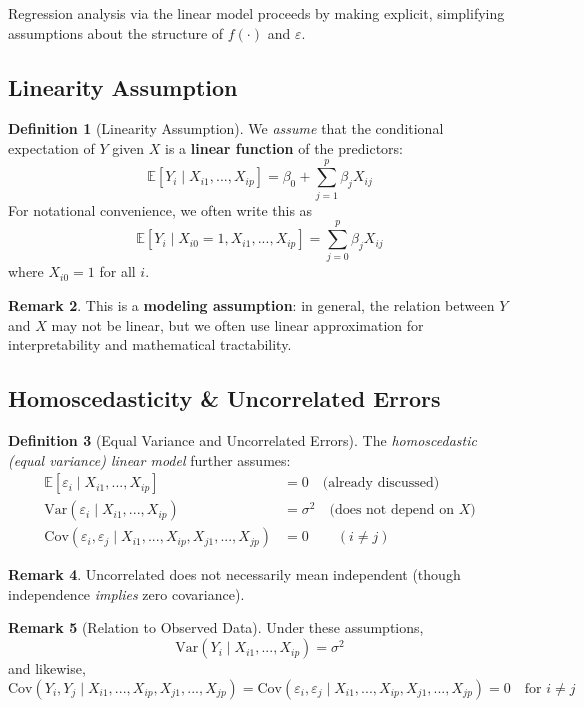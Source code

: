 \documentclass[11pt]{article}
\theoremstyle{definition}
\newtheorem{definition}{Definition}[section]
\theoremstyle{plain}
\theoremstyle{definition}
\newtheorem{remark}[definition]{Remark}
\begin{document}
Regression analysis via the linear model proceeds by making explicit, simplifying assumptions about the structure of $f(\cdot)$ and $\varepsilon$.

\subsection{Linearity Assumption}

\begin{definition}[Linearity Assumption]
We \emph{assume} that the conditional expectation of $Y$ given $X$ is a \textbf{linear function} of the predictors:
\[
\mathbb{E}[Y_i \mid X_{i1}, ..., X_{ip}] = \beta_0 + \sum_{j=1}^{p} \beta_j X_{ij}
\]
For notational convenience, we often write this as
\[
\mathbb{E}[Y_i \mid X_{i0}=1, X_{i1}, ..., X_{ip}] = \sum_{j=0}^p \beta_j X_{ij}
\]
where $X_{i0}=1$ for all $i$.
\end{definition}

\begin{remark}
This is a \textbf{modeling assumption}: in general, the relation between $Y$ and $X$ may not be linear, but we often use linear approximation for interpretability and mathematical tractability.
\end{remark}

\subsection{Homoscedasticity \& Uncorrelated Errors}

\begin{definition}[Equal Variance and Uncorrelated Errors]
The \emph{homoscedastic (equal variance) linear model} further assumes:
\begin{align*}
\mathbb{E}[\varepsilon_i \mid X_{i1},...,X_{ip}] &= 0 \quad\text{(already discussed)}\\
\mathrm{Var}(\varepsilon_i \mid X_{i1},...,X_{ip}) &= \sigma^2 \quad\text{(does not depend on $X$)}\\
\mathrm{Cov}(\varepsilon_i, \varepsilon_j \mid X_{i1},...,X_{ip}, X_{j1},...,X_{jp}) &= 0 \qquad (i \neq j)
\end{align*}
\end{definition}

\begin{remark}
Uncorrelated does not necessarily mean independent (though independence \emph{implies} zero covariance).
\end{remark}

\begin{remark}[Relation to Observed Data]
Under these assumptions,
\[
\mathrm{Var}(Y_i \mid X_{i1},..., X_{ip}) = \sigma^2
\]
and likewise,
\[
\mathrm{Cov}(Y_i, Y_j \mid X_{i1},...,X_{ip}, X_{j1},...,X_{jp}) = \mathrm{Cov}(\varepsilon_i, \varepsilon_j \mid X_{i1},...,X_{ip}, X_{j1},...,X_{jp}) = 0 \quad\text{for $i\neq j$}
\]
\end{remark}
\end{document}
